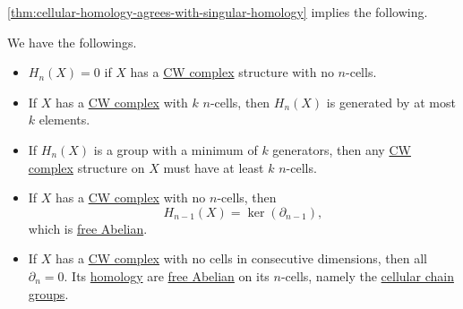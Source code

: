 \autoref{thm:cellular-homology-agrees-with-singular-homology} implies the following.
\begin{corollary}\label{col:lec-32}
	We have the followings.
	\begin{itemize}
		\item \(H_n(X) = 0\) if \(X\) has a \hyperref[def:CW-Complex]{CW complex} structure with no \(n\)-cells.
		\item If \(X\) has a \hyperref[def:CW-Complex]{CW complex} with \(k\) \(n\)-cells, then \(H_n(X)\) is generated by at most \(k\) elements.
		\item If \(H_n(X)\) is a group with a minimum of \(k\) generators, then any \hyperref[def:CW-Complex]{CW complex} structure on \(X\) must have at least \(k\) \(n\)-cells.
		\item If \(X\) has a \hyperref[def:CW-Complex]{CW complex} with no \(n\)-cells, then
		      \[
			      H_{n-1}(X) = \ker (\partial _{n-1}),
		      \]
		      which is \hyperref[def:free-Abelian-group]{free Abelian}.
		\item If \(X\) has a \hyperref[def:CW-Complex]{CW complex} with no cells in consecutive dimensions, then all \(\partial _n=0\).
		      Its \hyperref[def:cellular-homology-group]{homology} are \hyperref[def:free-Abelian-group]{free Abelian} on its \(n\)-cells,
		      namely the \hyperref[def:cellular-chain-complex]{cellular chain groups}.
	\end{itemize}
\end{corollary}
